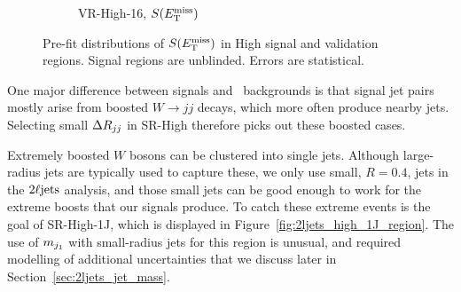 \begin{figure}[tp]
\begin{subfigure}{0.48\textwidth}
\caption{VR-High-16, $\metsig$}
\end{subfigure}
\caption[
Pre-fit distributions of $\metsig$ in High signal and validation regions
]{%
Pre-fit distributions of $\metsig$ in High signal and validation regions.
Signal regions are unblinded.
Errors are statistical.
}
\label{fig:2ljets_high_region}
\end{figure}

One major difference between signals and \diboson\ backgrounds is that signal
jet pairs mostly arise from boosted $W\to jj$ decays, which more often
produce nearby jets.
Selecting small $\Delta R_{jj}$ in SR-High therefore picks out these boosted cases.

Extremely boosted $W$ bosons can be clustered into single jets.
Although large-radius jets are typically used to capture these, we only use
small, $R=0.4$, jets in the $2\ell\mathrm{jets}$ analysis, and those small jets can
be good enough to work for the extreme boosts that our signals produce.
To catch these extreme events is the goal of SR-High-1J, which is displayed
in Figure~\ref{fig:2ljets_high_1J_region}.
The use of $m_{j_1}$ with small-radius jets for this region is unusual,
and required modelling of additional uncertainties that we discuss later in
Section~\ref{sec:2ljets_jet_mass}.

